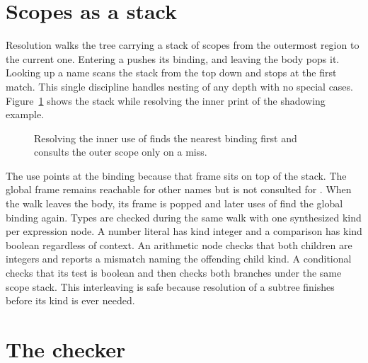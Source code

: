 \section{Scopes as a stack}
\label{sec:ch05-scopes-stack}

Resolution walks the tree carrying a stack of scopes from the outermost region to the current one.
Entering a  pushes its binding, and leaving the body pops it.
Looking up a name scans the stack from the top down and stops at the first match.
This single discipline handles nesting of any depth with no special cases.
Figure~\ref{fig:ch05-scope-chain} shows the stack while resolving the inner print of the shadowing example.
\begin{figure}
\centering
{}
\caption{Resolving the inner use of  finds the nearest binding first and consults the outer scope only on a miss.}
\label{fig:ch05-scope-chain}
\end{figure}
The use points at the  binding because that frame sits on top of the stack.
The global frame remains reachable for other names but is not consulted for .
When the walk leaves the  body, its frame is popped and later uses of  find the global binding again.
Types are checked during the same walk with one synthesized kind per expression node.
A number literal has kind integer and a comparison has kind boolean regardless of context.
An arithmetic node checks that both children are integers and reports a mismatch naming the offending child kind.
A conditional checks that its test is boolean and then checks both branches under the same scope stack.
This interleaving is safe because resolution of a subtree finishes before its kind is ever needed.

\section{The checker}
\label{sec:ch05-checker}


